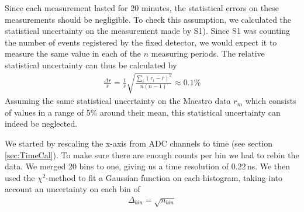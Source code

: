 \documentclass[a4paper,parskip,11pt, DIV12]{scrreprt}
\begin{document}
Since each measurement lasted for 20 minutes, the statistical errors on these measurements should be negligible. To check this assumption, we calculated the statistical uncertainty on the measurement made by S1). Since S1 was counting the number of events registered by the fixed detector, we would expect it to measure the same value in each of the $n$ measuring periods. The relative statistical uncertainty can thus be calculated by
%
\begin{align}
\frac{\Delta r}{\overline{r}} = \frac{1}{\overline{r}}\sqrt{\frac{\sum_i (r_i - \overline{r})^2}{n(n-1)}} \approx 0.1\%
\end{align}
%
Assuming the same statistical uncertainty on the Maestro data $r_m$ which consists of values in a range of $5\%$ around their mean, this statistical uncertainty can indeed be neglected.



We started by rescaling the x-axis from ADC channels to time (see section \ref{sec:TimeCal}). To make sure there are enough counts per bin we had to rebin the data. We merged 20 bins to one, giving us a time resolution of $0.22\,$ns. We then used the $\chi^2$-method to fit a Gaussian function on each histogram, taking into account an uncertainty on each bin of 
%
\begin{align}
\Delta_{bin} = \sqrt{n_{bin}}
\end{align}
\end{document}
